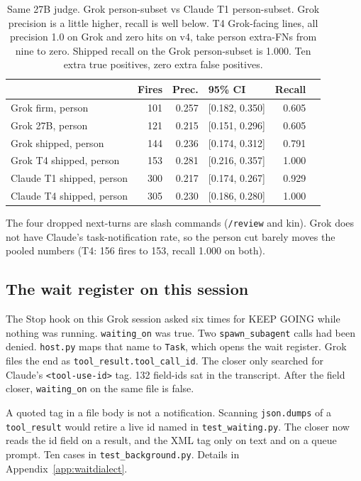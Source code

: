 \begin{table}[ht]
\centering
{\small\begin{tabular}{lrrlrr}
\toprule
 & Fires & Prec. & 95\% CI & Recall \\
\midrule
Grok firm, person & 101 & 0.257 & [0.182, 0.350] & 0.605 \\
Grok 27B, person & 121 & 0.215 & [0.151, 0.296] & 0.605 \\
Grok shipped, person & 144 & 0.236 & [0.174, 0.312] & 0.791 \\
Grok T4 shipped, person & 153 & 0.281 & [0.216, 0.357] & 1.000 \\
\midrule
Claude T1 shipped, person & 300 & 0.217 & [0.174, 0.267] & 0.929 \\
Claude T4 shipped, person & 305 & 0.230 & [0.186, 0.280] & 1.000 \\
\bottomrule
\end{tabular}}
\caption{Same 27B judge. Grok person-subset vs Claude T1
person-subset. Grok precision is a little higher, recall is
well below. T4 Grok-facing lines, all precision 1.0 on Grok and zero hits on
v4, take person extra-FNs from nine to zero. Shipped recall on the
Grok person-subset is 1.000. Ten extra true positives, zero extra
false positives.}
\label{tab:grokhuman}
\end{table}

The four dropped next-turns are slash commands (\texttt{/review}
and kin). Grok does not have Claude's task-notification rate, so
the person cut barely moves the pooled numbers (T4: 156 fires to
153, recall 1.000 on both).



\subsection{The wait register on this session}
\label{sec:waitdialect}

The Stop hook on this Grok session asked six times for KEEP GOING
while nothing was running. \texttt{waiting\_on} was true. Two
\texttt{spawn\_subagent} calls had been denied. \texttt{host.py}
maps that name to \texttt{Task}, which opens the wait register.
Grok files the end as \texttt{tool\_result.tool\_call\_id}. The
closer only searched for Claude's \texttt{<tool-use-id>} tag. 132
field-ids sat in the transcript. After the field closer,
\texttt{waiting\_on} on the same file is false.

A quoted tag in a file body is not a notification. Scanning
\texttt{json.dumps} of a \texttt{tool\_result} would retire a live
id named in \texttt{test\_waiting.py}. The closer now reads the
id field on a result, and the XML tag only on text and on a queue
prompt. Ten cases in \texttt{test\_background.py}. Details in
Appendix~\ref{app:waitdialect}.

